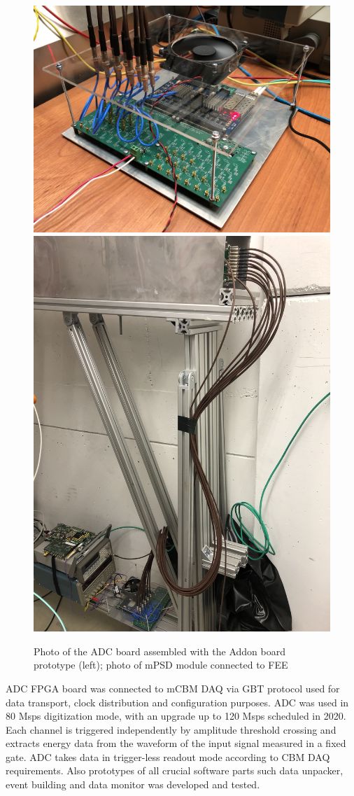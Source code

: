 \documentclass[a4paper,11pt]{article}
\begin{document}
\begin{figure}[htbp]
\centering %
\includegraphics[width=.5\textwidth]{mPSD_FEE_photo.JPG}
\qquad
\includegraphics[width=.4\textwidth]{mPSD_module_photo.JPG}
\caption{\label{fig:4} Photo of the ADC board assembled with the Addon board prototype (left); photo of mPSD module connected to FEE}
\end{figure}

ADC FPGA board was connected to mCBM DAQ via GBT protocol used for data transport, clock distribution and configuration purposes. ADC was used in 80 Msps digitization mode, with an upgrade up to 120 Msps scheduled in 2020. Each channel is triggered independently by amplitude threshold crossing and extracts energy data from the waveform of the input signal measured in a fixed gate. ADC takes data in trigger-less readout mode according to CBM DAQ requirements. Also prototypes of all crucial software parts such data unpacker, event building and data monitor was developed and tested.
\end{document}
